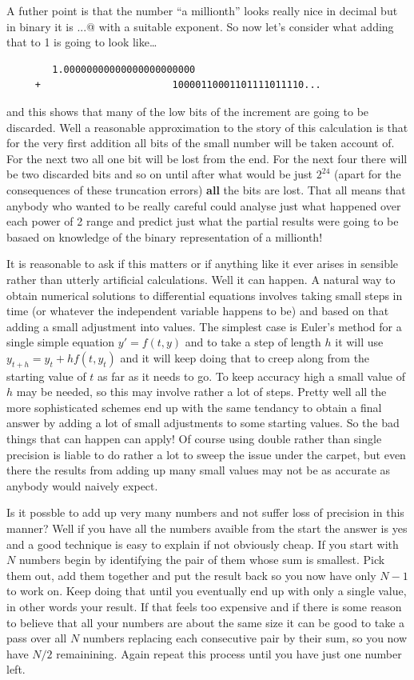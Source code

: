 A futher point is that the number ``a millionth'' looks really nice in
decimal but in binary it is ...@ with a suitable
exponent. So now let's consider what adding that to 1 is going to
look like\ldots
\begin{verbatim}
        1.00000000000000000000000
     +                       10000110001101111011110...
\end{verbatim}
and this shows that many of the low bits of the increment are going to
be discarded. Well a reasonable approximation to the story of this
calculation is that for the very first addition all bits of the
small number will be taken account of. For the next two all one bit
will be lost from the end. For the next four there will be two discarded
bits and so on until after what would be just $2^24$ (apart for the
consequences of these truncation errors) \textbf{all} the bits are lost.
That all means that anybody who wanted to be really careful could
analyse just what happened over each power of 2 range and predict
just what the partial results were going to be basaed on knowledge
of the binary representation of a millionth!

It is reasonable to ask if this matters or if anything like it ever
arises in sensible rather than utterly artificial calculations. Well
it can happen. A natural way to obtain numerical solutions to
differential equations involves taking small steps in time (or whatever
the independent variable happens to be) and based on that
adding a small adjustment into values. The simplest case is Euler's
method for a single simple equation $y' = f(t, y)$ and to
take a step of length $h$ it will use $y_{t+h} = y_{t} + h f(t, y_{t})$
and it will keep doing that to creep along from the starting value
of $t$ as far as it needs to go. To keep accuracy high a small
value of $h$ may be needed, so this may involve rather a lot of steps.
Pretty well all the more sophisticated schemes end up with the same
tendancy to obtain a final answer by adding a lot of small adjustments to
some starting values. So the bad things that can happen can apply!
Of course using double rather than single precision is liable to do
rather a lot to sweep the issue under the carpet, but even there the
results from adding up many small values may not be as accurate as
anybody would naively expect.

Is it possble to add up very many numbers and not suffer loss of precision
in this manner? Well if you have all the numbers avaible from the start
the answer is yes and a good technique is easy to explain if not
obviously cheap. If you start with $N$ numbers begin by identifying the
pair of them whose sum is smallest. Pick them out, add them together and
put the result back so you now have only $N-1$ to work on. Keep doing that
until you eventually end up with only a single value, in other words your
result. If that feels too expensive and if there is some reason to
believe that all your numbers are about the same size it can be good
to take a pass over all $N$ numbers replacing each consecutive pair by their
sum, so you now have $N/2$ remainining. Again repeat this process until
you have just one number left.

